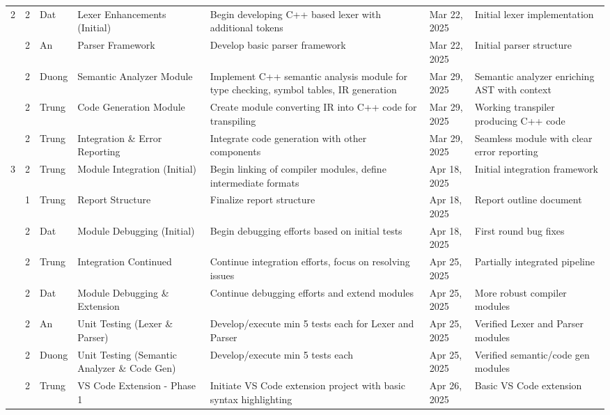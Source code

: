\documentclass[11pt]{article}
\begin{document}
\begin{longtable}{|p{}|p{}|p{}|p{}|p{}|p{}|p{}|}
\rowcolor{week2color} 
2 & 2 & Dat & Lexer Enhancements (Initial) & Begin developing C++ based lexer with additional tokens & Mar 22, 2025 & Initial lexer implementation \\
\rowcolor{week2color} 
& 2 & An & Parser Framework & Develop basic parser framework & Mar 22, 2025 & Initial parser structure \\
\rowcolor{week2color} 
& 2 & Duong & Semantic Analyzer Module & Implement C++ semantic analysis module for type checking, symbol tables, IR generation & Mar 29, 2025 & Semantic analyzer enriching AST with context \\
\rowcolor{week2color} 
&2 & Trung & Code Generation Module & Create module converting IR into C++ code for transpiling & Mar 29, 2025 & Working transpiler producing C++ code \\
\rowcolor{week2color} 
&2 & Trung & Integration \& Error Reporting & Integrate code generation with other components & Mar 29, 2025 & Seamless module with clear error reporting \\
\hline
\rowcolor{week3color} 
3 & 2 & Trung & Module Integration (Initial) & Begin linking of compiler modules, define intermediate formats & Apr 18, 2025 & Initial integration framework \\
\rowcolor{week3color} 
& 1& Trung & Report Structure & Finalize report structure & Apr 18, 2025 & Report outline document \\
\rowcolor{week3color} 
& 2& Dat & Module Debugging (Initial) & Begin debugging efforts based on initial tests & Apr 18, 2025 & First round bug fixes \\
\rowcolor{week3color} 
& 2 & Trung & Integration Continued & Continue integration efforts, focus on resolving issues & Apr 25, 2025 & Partially integrated pipeline \\
\rowcolor{week3color} 
& 2& Dat & Module Debugging \& Extension & Continue debugging efforts and extend modules & Apr 25, 2025 & More robust compiler modules \\
\rowcolor{week3color} 
& 2& An & Unit Testing (Lexer \& Parser) & Develop/execute min 5 tests each for Lexer and Parser & Apr 25, 2025 & Verified Lexer and Parser modules \\
\rowcolor{week3color} 
& 2& Duong & Unit Testing (Semantic Analyzer \& Code Gen) & Develop/execute min 5 tests each & Apr 25, 2025 & Verified semantic/code gen modules \\
\rowcolor{week3color} 
& 2 & Trung & VS Code Extension - Phase 1 & Initiate VS Code extension project with basic syntax highlighting & Apr 26, 2025 & Basic VS Code extension \\

\end{longtable}
\end{document}

